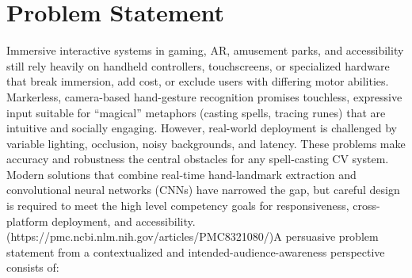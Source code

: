 









\section{Problem Statement}

 Immersive interactive systems in gaming, AR, amusement parks, and accessibility still rely heavily on handheld controllers, touchscreens, or specialized hardware that break immersion, add cost, or exclude users with differing motor abilities. Markerless, camera-based hand-gesture recognition promises touchless, expressive input suitable for “magical” metaphors (casting spells, tracing runes) that are intuitive and socially engaging. However, real-world deployment is challenged by variable lighting, occlusion, noisy backgrounds, and latency. These problems make accuracy and robustness the central obstacles for any spell-casting CV system. Modern solutions that combine real-time hand-landmark extraction and convolutional neural networks (CNNs) have narrowed the gap, but careful design is required to meet the high level competency goals for responsiveness, cross-platform deployment, and accessibility. (https://pmc.ncbi.nlm.nih.gov/articles/PMC8321080/)\noindent A persuasive problem statement from a contextualized and intended-audience-awareness perspective consists of:

